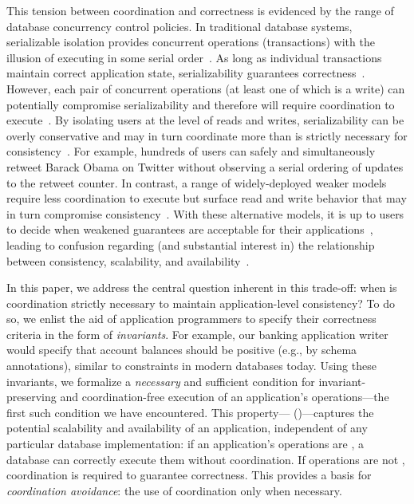 This tension between coordination and correctness is
evidenced by the range of database concurrency control policies. In
traditional database systems, serializable isolation provides
concurrent operations (transactions) with the illusion of executing in
some serial order~\cite{bernstein-book}. As long as individual
transactions maintain correct application state, serializability
guarantees correctness~\cite{gray-virtues}. However, each pair of
concurrent operations (at least one of which is a write) can
potentially compromise serializability and therefore will require
coordination to execute~\cite{hat-vldb,davidson-survey}. By isolating
users at the level of reads and writes, serializability can be overly
conservative and may in turn coordinate more than is strictly
necessary for
consistency~\cite{lamport-audit,tamer-book,ic-survey,weihl-thesis}.
For example, hundreds of users can safely and simultaneously retweet
Barack Obama on Twitter without observing a serial ordering of updates
to the retweet counter. In contrast, a range of widely-deployed weaker
models require less coordination to execute but surface read and write
behavior that may in turn compromise
consistency~\cite{dynamo,optimistic,adya-isolation,hat-vldb}. With
these alternative models, it is up to users to decide when weakened
guarantees are acceptable for their
applications~\cite{consistency-borders}, leading to confusion
regarding (and substantial interest in) the relationship between
consistency, scalability, and
availability~\cite{hat-vldb,pacelc,dynamo,gilbert-cap,davidson-survey,kohler-commutativity,redblue-new,queue}.


In this paper, we address the central question inherent in this
trade-off: when is coordination strictly necessary to maintain
application-level consistency? To do so, we enlist the aid of
application programmers to specify their correctness criteria in the
form of \textit{invariants}. For example, our banking application
writer would specify that account balances should be positive (e.g.,
by schema annotations), similar to constraints in modern databases
today. Using these invariants, we formalize a \textit{necessary} and
sufficient condition for invariant-preserving and coordination-free
execution of an application's operations---the first such condition we
have encountered. This property---\fullnameconfluence
(\iconfluence)---captures the potential scalability and availability
of an application, independent of any particular database
implementation: if an application's operations are \iconfluent, a
database can correctly execute them without coordination. If
operations are not \iconfluent, coordination is required to
guarantee correctness. This provides a basis for \textit{coordination
  avoidance}: the use of coordination only when necessary.

